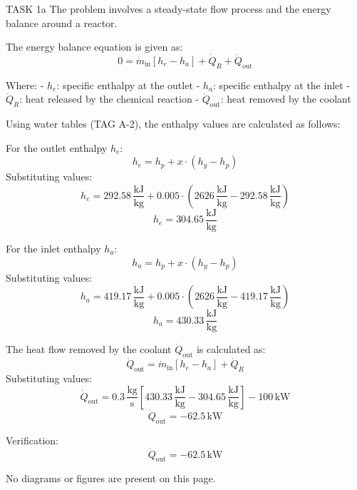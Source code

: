 TASK 1a  
The problem involves a steady-state flow process and the energy balance around a reactor.  

The energy balance equation is given as:  
\[
0 = \dot{m}_{\text{in}} \left[ h_e - h_a \right] + \dot{Q}_R + \dot{Q}_{\text{out}}
\]  

Where:  
- \( h_e \): specific enthalpy at the outlet  
- \( h_a \): specific enthalpy at the inlet  
- \( \dot{Q}_R \): heat released by the chemical reaction  
- \( \dot{Q}_{\text{out}} \): heat removed by the coolant  

Using water tables (TAG A-2), the enthalpy values are calculated as follows:  

For the outlet enthalpy \( h_e \):  
\[
h_e = h_p + x \cdot \left( h_y - h_p \right)
\]  
Substituting values:  
\[
h_e = 292.58 \, \frac{\text{kJ}}{\text{kg}} + 0.005 \cdot \left( 2626 \, \frac{\text{kJ}}{\text{kg}} - 292.58 \, \frac{\text{kJ}}{\text{kg}} \right)
\]  
\[
h_e = 304.65 \, \frac{\text{kJ}}{\text{kg}}
\]  

For the inlet enthalpy \( h_a \):  
\[
h_a = h_p + x \cdot \left( h_y - h_p \right)
\]  
Substituting values:  
\[
h_a = 419.17 \, \frac{\text{kJ}}{\text{kg}} + 0.005 \cdot \left( 2626 \, \frac{\text{kJ}}{\text{kg}} - 419.17 \, \frac{\text{kJ}}{\text{kg}} \right)
\]  
\[
h_a = 430.33 \, \frac{\text{kJ}}{\text{kg}}
\]  

The heat flow removed by the coolant \( \dot{Q}_{\text{out}} \) is calculated as:  
\[
\dot{Q}_{\text{out}} = \dot{m}_{\text{in}} \left[ h_e - h_a \right] + \dot{Q}_R
\]  
Substituting values:  
\[
\dot{Q}_{\text{out}} = 0.3 \, \frac{\text{kg}}{\text{s}} \left[ 430.33 \, \frac{\text{kJ}}{\text{kg}} - 304.65 \, \frac{\text{kJ}}{\text{kg}} \right] - 100 \, \text{kW}
\]  
\[
\dot{Q}_{\text{out}} = -62.5 \, \text{kW}
\]  

Verification:  
\[
\dot{Q}_{\text{out}} = -62.5 \, \text{kW}
\]  

No diagrams or figures are present on this page.